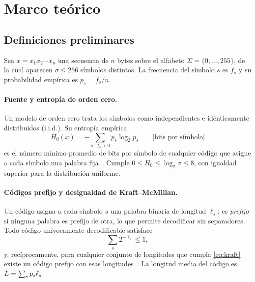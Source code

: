 \section{Marco teórico}
\label{sec:marco-teorico}

\subsection{Definiciones preliminares}
\label{sec:definiciones}
Sea $x = x_1x_2\cdots x_n$ una secuencia de $n$ bytes sobre el alfabeto
$\Sigma = \{0,\dots,255\}$, de la cual aparecen $\sigma \le 256$ símbolos distintos. La
frecuencia del símbolo $s$ es $f_s$ y su probabilidad empírica es $p_s = f_s/n$.

\paragraph{Fuente y entropía de orden cero.} Un modelo de orden cero trata los símbolos como
independientes e idénticamente distribuidos (i.i.d.). Su entropía empírica
\begin{equation}
  H_0(x) = -\sum_{s\,:\,f_s>0} p_s \log_2 p_s \qquad \text{[bits por símbolo]}
  \label{eq:entropia}
\end{equation}
es el número mínimo promedio de bits por símbolo de cualquier código que asigne a cada
símbolo una palabra fija~\cite{shannon1948}. Cumple $0 \le H_0 \le \log_2\sigma \le 8$, con
igualdad superior para la distribución uniforme.

\paragraph{Códigos prefijo y desigualdad de Kraft--McMillan.} Un código asigna a cada símbolo
$s$ una palabra binaria de longitud $\ell_s$; es \emph{prefijo} si ninguna palabra es prefijo
de otra, lo que permite decodificar sin separadores. Todo código unívocamente decodificable
satisface
\begin{equation}
  \sum_{s} 2^{-\ell_s} \le 1,
  \label{eq:kraft}
\end{equation}
y, recíprocamente, para cualquier conjunto de longitudes que cumpla \eqref{eq:kraft} existe un
código prefijo con esas longitudes~\cite{sayood2017,salomon2010}. La longitud media del código
es $\bar{L} = \sum_s p_s \ell_s$.

